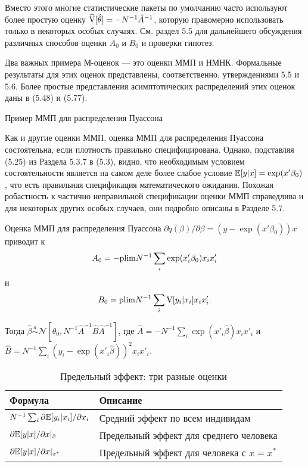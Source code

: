 Вместо этого многие статистические пакеты по умолчанию часто используют более простую оценку $\widehat{\mathrm{V}}[\hat{\theta}]=-N^{-1}\hat{A}^{-1}$, которую правомерно использовать только в некоторых особых случаях. См. раздел 5.5 для дальнейшего обсуждения различных способов оценки $A_0$ и $B_0$ и проверки гипотез.

Два важных примера М-оценок --- это оценки ММП и НМНК. Формальные результаты для этих оценок представлены, соответственно, утверждениями 5.5 и 5.6. Более простые представления асимптотических распределений этих оценок даны в (5.48) и (5.77).

\begin{center}
Пример ММП для распределения Пуассона 
\end{center}

Как и другие оценки ММП, оценка ММП для распределения Пуассона состоятельна, если плотность правильно специфицирована. Однако, подставляя (5.25) из Раздела 5.3.7 в (5.3), видно, что необходимым условием состоятельности является на самом деле более слабое условие  $\mathbb{E}[y|x]=\exp(x'\beta_0)$, что есть правильная спецификация математического ожидания. Похожая робастность к частично неправильной спецификации оценки ММП справедлива и для некоторых других особых случаев, они подробно описаны в Разделе 5.7.

Оценка ММП для распределения Пуассона $\partial q(\beta) / \partial \beta= (y-\exp(x'\beta_0))x$ приводит к 
\[
A_0=-\mathrm{plim } N^{-1} \sum_i \exp(x'_i\beta_0)x_i x'_i
\]
и
\[
B_0=\mathrm{plim } N^{-1} \sum_i \mathrm{V}[y_i|x_i] x_i x'_i.
\]
 
Тогда $\hat{\beta} \stackrel{a}{\sim}\mathcal{N}[\theta_0,N^{-1} \hat{A}^{-1} \hat{B} \hat{A}^{-1}]$, где $\hat{A}=- N^{-1} \sum_i \exp(x'_i \hat{\beta})x_i x'_i$ и $\hat{B}=N^{-1} \sum_i (y_i - \exp(x'_i \hat{\beta}))^2 x_i x'_i$.

\begin{table}[h]
\begin{center}
\caption{\label{tab:pred3est}Предельный эффект: три разные оценки}
\begin{tabular}[t]{ll}
\hline
\hline
\bf{Формула} & \bf{Описание} \\
\hline
$N^{-1} \sum_i \partial \mathbb{E}[y_i|x_i] / \partial x_i$ & Средний эффект по всем индивидам \\
$\partial \mathbb{E}[y|x] / \partial x |_{\bar{x}}$ & Предельный эффект для среднего человека \\
$\partial \mathbb{E}[y|x] / \partial x |_{x^*}$ & Предельный эффект для человека с $x=x^*$\\
\hline
\hline
\end{tabular}
\end{center}
\end{table}

